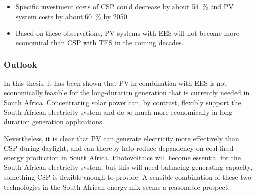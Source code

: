 \begin{itemize}
\item Specific investment costs of \ac{CSP} could decrease by about \SI{54}{\percent} and \ac{PV} system costs by about \SI{60}{\percent} by 2050.


\item Based on these observations, \ac{PV} systems with \ac{EES} will not become more economical than \ac{CSP} with \ac{TES} in the coming decades.
\end{itemize}

\subsubsection{Outlook}

In this thesis, it has been shown that \ac{PV} in combination with \ac{EES} is not economically feasible for the long-duration generation that is currently needed in South Africa. Concentrating solar power can, by contrast, flexibly support the South African electricity system and do so much more economically in long-duration generation applications. 


Nevertheless, it is clear that \ac{PV} can generate electricity more effectively than \ac{CSP} during daylight, and can thereby help reduce dependency on coal-fired energy production in South Africa. Photovoltaics will become essential for the South African electricity system, but this will need balancing generating capacity, something \ac{CSP} is flexible enough to provide. A sensible combination of these two technologies in the South African energy mix seems a reasonable prospect.

\clearpage